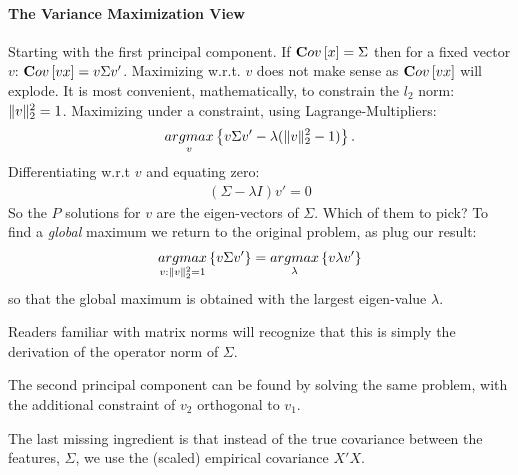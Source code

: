 \paragraph{The Variance Maximization View}
Starting with the first principal component.
If $\mathbf{C}ov \left[ x \right]=\Sigma$ then for a fixed vector $v$: $\mathbf{C}ov \left[ vx \right]=v \Sigma v'$.
Maximizing w.r.t. $v$ does not make sense as $\mathbf{C}ov \left[ vx \right]$ will explode. 
It is most convenient, mathematically, to constrain the $l_2$ norm: $\Vert v \Vert_2^2=1$.
Maximizing under a constraint, using Lagrange-Multipliers: 
\begin{align}
 \mathop{argmax}_{v}\left\{ v \Sigma v' - \lambda (\Vert v \Vert_2^2-1) \right\}.
\end{align}
Differentiating w.r.t $v$ and equating zero: 
\begin{align}
	(\Sigma- \lambda I)v'=0
\end{align}
So the $P$ solutions for $v$ are the eigen-vectors of $\Sigma$. Which of them to pick? 
To find a \emph{global} maximum we return to the original problem, as plug our result:
\begin{align}
\label{eq:pca_maximal_variance}
 \mathop{argmax}_{v:\Vert v \Vert_2^2=1}\left\{ v \Sigma v'  \right\}=\mathop{argmax}_{\lambda}\left\{ v \lambda v'  \right\}
\end{align}
so that the global maximum is obtained with the largest eigen-value $\lambda$.

Readers familiar with matrix norms will recognize that this is simply the derivation of the operator norm of $\Sigma$.

The second principal component can be found by solving the same problem, with the additional constraint of $v_2$ orthogonal to $v_1$.

The last missing ingredient is that instead of the true covariance between the features, $\Sigma$, we use the (scaled) empirical covariance $X'X$.




